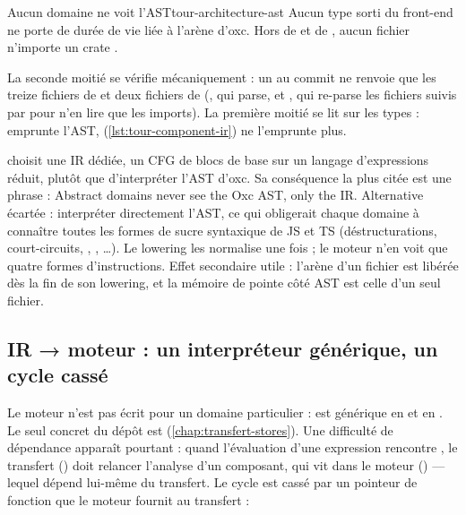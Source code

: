 \begin{invariant}{Aucun domaine ne voit l'AST}{tour-architecture-ast}
Aucun type sorti du front-end ne porte de durée de vie liée à l'arène d'oxc. Hors de  et de , aucun fichier n'importe un crate .
\end{invariant}

La seconde moitié se vérifie mécaniquement : un  au commit \snapshotCommit{} ne renvoie que les treize fichiers de  et deux fichiers de  (, qui parse, et , qui re-parse les fichiers suivis par  pour n'en lire que les imports). La première moitié se lit sur les types :  emprunte l'AST,  (\cref{lst:tour-component-ir}) ne l'emprunte plus.

\begin{decision}[ADR-3]
 choisit une IR dédiée, un CFG de blocs de base sur un langage d'expressions réduit, plutôt que d'interpréter l'AST d'oxc. Sa conséquence la plus citée est une phrase : \og Abstract domains never see the Oxc AST, only the IR.\fg{} Alternative écartée : interpréter directement l'AST, ce qui obligerait chaque domaine à connaître toutes les formes de sucre syntaxique de JS et TS (déstructurations, court-circuits, , , \ldots). Le lowering les normalise une fois ; le moteur n'en voit que quatre formes d'instructions. Effet secondaire utile : l'arène d'un fichier est libérée dès la fin de son lowering, et la mémoire de pointe côté AST est celle d'un seul fichier.
\end{decision}

\subsection{IR → moteur : un interpréteur générique, un cycle cassé}

Le moteur n'est pas écrit pour un domaine particulier :  est générique en  et  en . Le seul  concret du dépôt est  (\cref{chap:transfert-stores}). Une difficulté de dépendance apparaît pourtant : quand l'évaluation d'une expression rencontre , le transfert () doit relancer l'analyse d'un composant, qui vit dans le moteur () --- lequel dépend lui-même du transfert. Le cycle est cassé par un pointeur de fonction que le moteur fournit au transfert :

